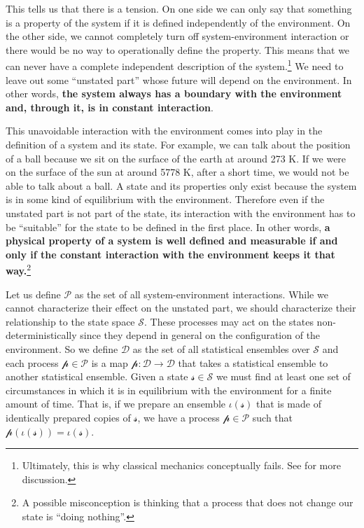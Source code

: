 \documentclass[11pt]{article}
\begin{document}
This tells us that there is a tension. On one side we can only say that something is a property of the system if it is defined independently of the environment. On the other side, we cannot completely turn off system-environment interaction or there would be no way to operationally define the property. This means that we can never have a complete independent description of the system.\footnote{Ultimately, this is why classical mechanics conceptually fails. See \cite{Carc1} for more discussion.} We need to leave out some ``unstated part'' whose future will depend on the environment. In other words, \textbf{the system always has a boundary with the environment and, through it, is in constant interaction}.

This unavoidable interaction with the environment comes into play in the definition of a system and its state. For example, we can talk about the position of a ball because we sit on the surface of the earth at around 273 K. If we were on the surface of the sun at around 5778 K, after a short time, we would not be able to talk about a ball. A state and its properties only exist because the system is in some kind of equilibrium with the environment. Therefore even if the unstated part is not part of the state, its interaction with the environment has to be ``suitable'' for the state to be defined in the first place. In other words, \textbf{a physical property of a system is well defined and measurable if and only if the constant interaction with the environment keeps it that way.}\footnote{A possible misconception is thinking that a process that does not change our state is ``doing nothing''.}

Let us define $\mathcal{P}$ as the set of all system-environment interactions. While we cannot characterize their effect on the unstated part, we should characterize their relationship to the state space $\mathcal{S}$. These processes may act on the states non-deterministically since they depend in general on the configuration of the environment. So we define $\mathcal{D}$ as the set of all statistical ensembles over $\mathcal{S}$ and each process $\mathcal{p} \in \mathcal{P}$ is a map $\mathcal{p} : \mathcal{D} \to \mathcal{D}$ that takes a statistical ensemble to another statistical ensemble. Given a state $\mathcal{s} \in \mathcal{S}$ we must find at least one set of circumstances in which it is in equilibrium with the environment for a finite amount of time. That is, if we prepare an ensemble $\iota(\mathcal{s})$ that is made of identically prepared copies of $\mathcal{s}$, we have a process $\mathcal{p} \in \mathcal{P}$ such that $\mathcal{p}(\iota(\mathcal{s})) = \iota(\mathcal{s})$.
\end{document}
